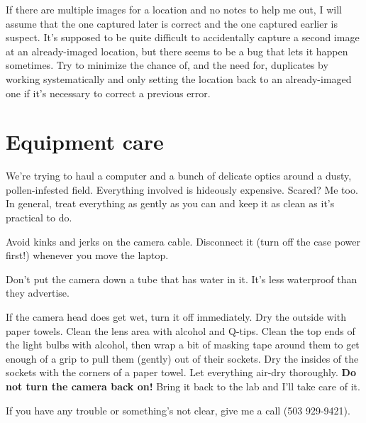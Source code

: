 \documentclass[11pt]{article}
\begin{document}
	If there are multiple images for a location and no notes to help me out, I will assume that the one captured later is correct and the one captured earlier is suspect. It's supposed to be quite difficult to accidentally capture a second image at an already-imaged location, but there seems to be a bug that lets it happen sometimes. Try to minimize the chance of, and the need for, duplicates by working systematically and only setting the location back to an already-imaged one if it's necessary to correct a previous error.


\section{Equipment care}
	We're trying to haul a computer and a bunch of delicate optics around a dusty, pollen-infested field. Everything involved is hideously expensive. Scared? Me too. In general, treat everything as gently as you can and keep it as clean as it's practical to do.
	
	Avoid kinks and jerks on the camera cable. Disconnect it (turn off the case power first!) whenever you move the laptop.
	
	Don't put the camera down a tube that has water in it. It's less waterproof than they advertise. 
	
	If the camera head does get wet, turn it off immediately. Dry the outside with paper towels. Clean the lens area with alcohol and Q-tips. Clean the top ends of the light bulbs with alcohol, then wrap a bit of masking tape around them to get enough of a grip to pull them (gently) out of their sockets. Dry the insides of the sockets with the corners of a paper towel. Let everything air-dry thoroughly. \textbf{Do not turn the camera back on!} Bring it back to the lab and I'll take care of it.
	
	
If you have any trouble or something's not clear, give me a call (503 929-9421). 
\end{document}
